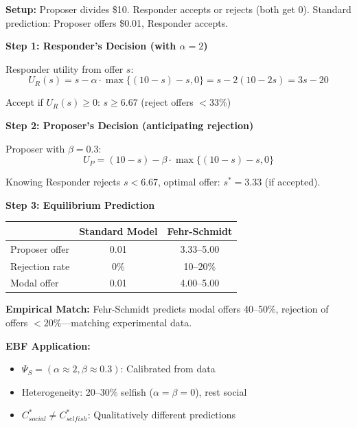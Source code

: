 \begin{tcolorbox}[colback=orange!5!white, colframe=orange!75!black,
    title=\textbf{Worked Example: Ultimatum Game with Inequality Aversion}]

\textbf{Setup:} Proposer divides \$10. Responder accepts or rejects (both get 0).
Standard prediction: Proposer offers \$0.01, Responder accepts.

\textbf{Step 1: Responder's Decision (with $\alpha = 2$)}

Responder utility from offer $s$:
\[
U_R(s) = s - \alpha \cdot \max\{(10-s) - s, 0\} = s - 2(10 - 2s) = 3s - 20
\]

Accept if $U_R(s) \geq 0$: $s \geq 6.67$ (reject offers $< 33\%$)

\textbf{Step 2: Proposer's Decision (anticipating rejection)}

Proposer with $\beta = 0.3$:
\[
U_P = (10-s) - \beta \cdot \max\{(10-s) - s, 0\}
\]

Knowing Responder rejects $s < 6.67$, optimal offer: $s^* = 3.33$ (if accepted).

\textbf{Step 3: Equilibrium Prediction}

\begin{center}
\renewcommand{\arraystretch}{1.2}
\begin{tabular}{@{}lcc@{}}
\toprule
& \textbf{Standard Model} & \textbf{Fehr-Schmidt} \\
\midrule
Proposer offer & 0.01 & 3.33--5.00 \\
Rejection rate & 0\% & 10--20\% \\
Modal offer & 0.01 & 4.00--5.00 \\
\bottomrule
\end{tabular}
\end{center}

\textbf{Empirical Match:} Fehr-Schmidt predicts modal offers 40--50\%, rejection
of offers $<20\%$---matching experimental data.

\textbf{EBF Application:}
\begin{itemize}[nosep]
    \item $\Psi_S = (\alpha \approx 2, \beta \approx 0.3)$: Calibrated from data
    \item Heterogeneity: 20--30\% selfish ($\alpha = \beta = 0$), rest social
    \item $C^*_{social} \neq C^*_{selfish}$: Qualitatively different predictions
\end{itemize}

\end{tcolorbox}

